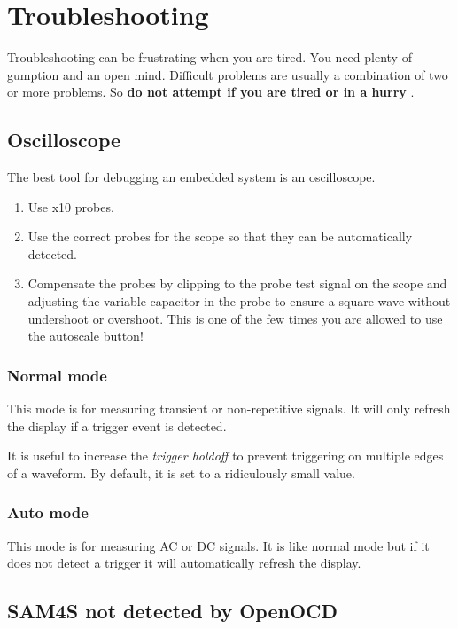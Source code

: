 \chapter{Troubleshooting}
\label{troubleshooting}

Troubleshooting can be frustrating when you are tired. You need plenty
of gumption and an open mind. Difficult problems are usually a
combination of two or more problems. So \textbf{do not attempt if you
are tired or in a hurry} .

\section{Oscilloscope}
\label{oscilloscope}

The best tool for debugging an embedded system is an oscilloscope.

\begin{enumerate}
\item
  Use x10 probes.
\item
  Use the correct probes for the scope so that they can be automatically
  detected.
\item
  Compensate the probes by clipping to the probe test signal on the
  scope and adjusting the variable capacitor in the probe to ensure a
  square wave without undershoot or overshoot. This is one of the few
  times you are allowed to use the autoscale button!
\end{enumerate}

\subsection{Normal mode}
\label{normal-mode}

This mode is for measuring transient or non-repetitive signals. It will
only refresh the display if a trigger event is detected.

It is useful to increase the \emph{trigger holdoff} to prevent
triggering on multiple edges of a waveform. By default, it is set to a
ridiculously small value.

\subsection{Auto mode}
\label{auto-mode}

This mode is for measuring AC or DC signals. It is like normal mode but
if it does not detect a trigger it will automatically refresh the
display.

\section{SAM4S not detected by OpenOCD}
\label{sam4s-not-detected-by-openocd}


